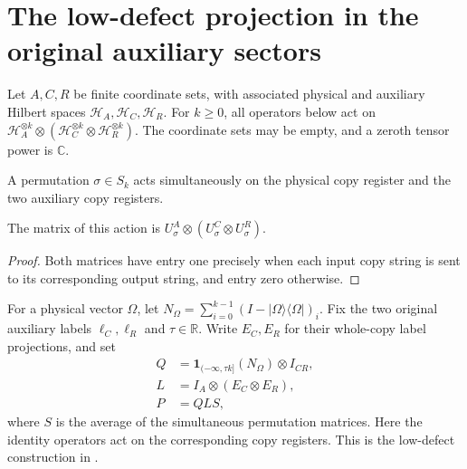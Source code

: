 \section{The low-defect projection in the original auxiliary sectors}
\label{sec:replica_low_defect_projection}

Let $A,C,R$ be finite coordinate sets, with associated physical and
auxiliary Hilbert spaces $\mathcal H_A,\mathcal H_C,\mathcal H_R$.
For $k\ge0$, all operators below act on
$\mathcal H_A^{\otimes k}\otimes
(\mathcal H_C^{\otimes k}\otimes\mathcal H_R^{\otimes k})$.
The coordinate sets may be empty, and a zeroth tensor power is $\mathbb C$.

\begin{definition}
\label{def:replica_joint_copy_action}
\leanok
A permutation $\sigma\in S_k$ acts simultaneously on the physical
copy register and the two auxiliary copy registers.
\end{definition}

\begin{theorem}
\label{thm:replica_joint_copy_operator}
\leanok
{}
The matrix of this action is
$U^A_\sigma\otimes(U^C_\sigma\otimes U^R_\sigma)$.
\end{theorem}
\begin{proof}
\leanok
Both matrices have entry one precisely when each input copy string is
sent to its corresponding output string, and entry zero otherwise.
\end{proof}

\begin{definition}
\label{def:replica_low_defect_projection}
\leanok
{}
For a physical vector $\Omega$, let
$N_\Omega=\sum_{i=0}^{k-1}(I-|\Omega\rangle\langle\Omega|)_i$.
Fix the two original auxiliary labels $\ell_C,\ell_R$ and $\tau\in\mathbb R$.
Write $E_C,E_R$ for their whole-copy label projections, and set
\begin{align}
 Q&=\mathbf1_{(-\infty,\tau k]}(N_\Omega)\otimes I_{CR},\\
 L&=I_A\otimes(E_C\otimes E_R),\\
 P&=QLS,
\end{align}
where $S$ is the average of the simultaneous permutation matrices.
Here the identity operators act on the corresponding copy registers.
This is the low-defect construction in
\cite[Section~8, \textup{(comparator:defect-mass)}]{OpenAI2026AreaLaw}.
\end{definition}

